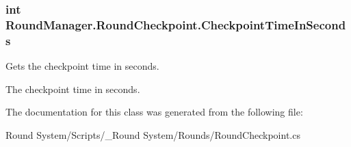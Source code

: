 \subsubsection[{Checkpoint\+Time\+In\+Seconds}]{\setlength{\rightskip}{0pt plus 5cm}int Round\+Manager.\+Round\+Checkpoint.\+Checkpoint\+Time\+In\+Seconds\hspace{0.3cm}{\ttfamily [get]}}\label{class_round_manager_1_1_round_checkpoint_a999618b6a717923fb7afd4b2d09e7f0c}


Gets the checkpoint time in seconds. 

The checkpoint time in seconds.

The documentation for this class was generated from the following file\+:\begin{DoxyCompactItemize}
\item 
Round System/\+Scripts/\+\_\+\+Round System/\+Rounds/Round\+Checkpoint.\+cs\end{DoxyCompactItemize}
